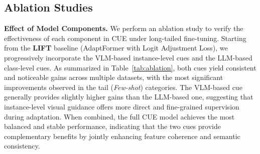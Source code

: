 \subsection{Ablation Studies}
\noindent \textbf{Effect of Model Components.}
We perform an ablation study to verify the effectiveness of each component in CUE under long-tailed fine-tuning.
Starting from the \textbf{LIFT} baseline (AdaptFormer with Logit Adjustment Loss), we progressively incorporate the VLM-based instance-level cues and the LLM-based class-level cues.
As summarized in Table~\ref{tab:ablation}, both cues yield consistent and noticeable gains across multiple datasets, with the most significant improvements observed in the tail (\textit{Few-shot}) categories.
The VLM-based cue generally provides slightly higher gains than the LLM-based one, suggesting that instance-level visual guidance offers more direct and fine-grained supervision during adaptation.
When combined, the full CUE model achieves the most balanced and stable performance, indicating that the two cues provide complementary benefits by jointly enhancing feature coherence and semantic consistency.

